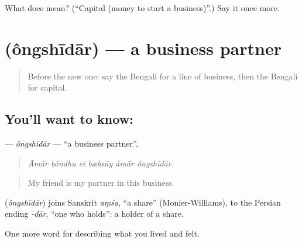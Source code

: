 \begin{tcolorbox}[breakable,colback=teal!4,colframe=teal!35!black,title={Before you move on}]
What does  mean? (\textquotedblleft{}Capital (money to start a business)\textquotedblright{}.) Say it once more.
\end{tcolorbox}
\section[\texorpdfstring{\bn{অংশীদার} (ôngshīdār)}{অংশীদার (ôngshīdār)}]{ (ôngshīdār) — a business partner}

\label{lesson:BN-C498-ongshidar}



\begin{quote}
Before the new one: say the Bengali for a line of business, then the Bengali for capital.
\end{quote}

\subsection*{You'll want to know: }
\textbf{} — \emph{ôngshīdār} — \textquotedblleft{}a business partner\textquotedblright{}.

\begin{quote}
     
\end{quote}

\begin{quote}
\emph{Āmār bôndhu ei bæbsāy āmār ôngshīdār.}
\end{quote}

\begin{quote}
My friend is my partner in this business.
\end{quote}

\begin{cousinweb}
\textbf{} (\emph{ôngshīdār}) joins Sanskrit \emph{aṃśa}, \textquotedblleft{}a share\textquotedblright{} (Monier-Williams), to the Persian ending \emph{-dār}, \textquotedblleft{}one who holds\textquotedblright{}: a holder of a share.
\end{cousinweb}

\begin{grammarlens}[title={What you've built}]
One more word for describing what you lived and felt.
\end{grammarlens}

